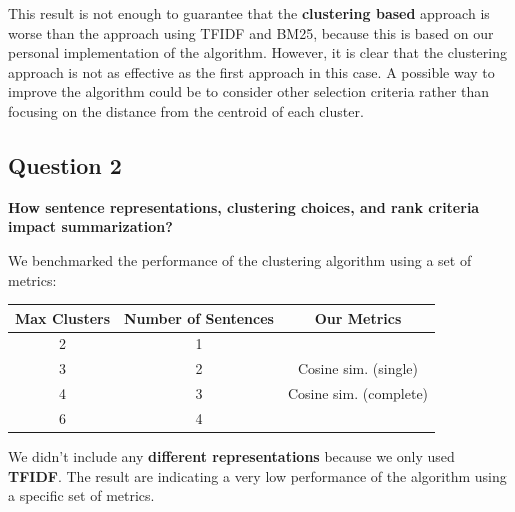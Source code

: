 This result is not enough to guarantee that the \textbf{clustering based} approach is
worse than the approach using TFIDF and BM25, because this is based on our
personal implementation of the algorithm. However, it is clear that the
clustering approach is not as effective as the first approach in this case. A
possible way to improve the algorithm could be to consider other selection criteria rather than focusing on the distance from the centroid of each cluster.

\subsection{Question 2}
\textbf{How sentence representations, clustering choices, and rank criteria impact summarization?}

We benchmarked the performance of the clustering algorithm using a set of
metrics:
\begin{table}[H]
  \centering
  \begin{tabular}{|c|c|c|}
    \hline
    \textbf{Max Clusters} & \textbf{Number of Sentences} & \textbf{Our Metrics}  \\
    \hline
    2                     & 1                            &                       \\
    3                     & 2                            & Cosine sim. (single)  \\
    4                     & 3                            & Cosine sim. (complete)\\
    6                     & 4                            &                       \\
   \hline
  \end{tabular}
\end{table}

We didn't include any \textbf{different representations} because we only used \textbf{TFIDF}. The result are indicating a very low
performance of the algorithm using a specific set of metrics.

